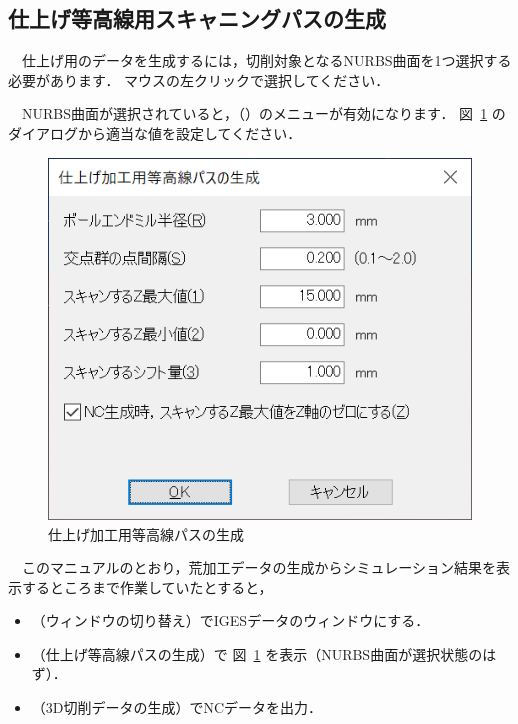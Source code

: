 
\subsection{仕上げ等高線用スキャニングパスの生成}
　仕上げ用のデータを生成するには，切削対象となるNURBS曲面を1つ選択する必要があります．
マウスの左クリックで選択してください．

　NURBS曲面が選択されていると，（）のメニューが有効になります．
図~\ref{fig:ncvc31} のダイアログから適当な値を設定してください．

\begin{figure}[H]
\centering
\includegraphics{No3/fig/fig31.png}
\caption{仕上げ加工用等高線パスの生成}
\label{fig:ncvc31}
\end{figure}

　このマニュアルのとおり，荒加工データの生成からシミュレーション結果を表示するところまで作業していたとすると，

\begin{itemize}
\item {}（ウィンドウの切り替え）でIGESデータのウィンドウにする．
\item {}（仕上げ等高線パスの生成）で 図~\ref{fig:ncvc31} を表示（NURBS曲面が選択状態のはず）．
\item {}（3D切削データの生成）でNCデータを出力．
\end{itemize}

